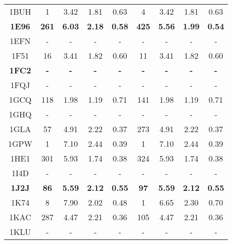 \begin{longtable}{c c c c c|c c c c}
 {\tiny 1BUH} &{\tiny 1}&{\tiny 3.42}&{\tiny 1.81}&{\tiny 0.63} &{\tiny 4}&{\tiny 3.42}&{\tiny 1.81}&{\tiny 0.63}\\ 
 \textbf{\tiny 1E96} &\textbf{\tiny 261}&\textbf{\tiny 6.03}&\textbf{\tiny 2.18}&\textbf{\tiny 0.58} &\textbf{\tiny 425}&\textbf{\tiny 5.56}&\textbf{\tiny 1.99}&\textbf{\tiny 0.54}\\ 
 {\tiny 1EFN} &{\tiny -}&{\tiny -}&{\tiny -}&{\tiny -} &{\tiny -}&{\tiny -}&{\tiny -}&{\tiny -}\\ 
 {\tiny 1F51} &{\tiny 16}&{\tiny 3.41}&{\tiny 1.82}&{\tiny 0.60} &{\tiny 11}&{\tiny 3.41}&{\tiny 1.82}&{\tiny 0.60}\\ 
 \textbf{\tiny 1FC2} &\textbf{\tiny -}&\textbf{\tiny -}&\textbf{\tiny -}&\textbf{\tiny -} &\textbf{\tiny -}&\textbf{\tiny -}&\textbf{\tiny -}&\textbf{\tiny -}\\ 
 {\tiny 1FQJ} &{\tiny -}&{\tiny -}&{\tiny -}&{\tiny -} &{\tiny -}&{\tiny -}&{\tiny -}&{\tiny -}\\ 
 {\tiny 1GCQ} &{\tiny 118}&{\tiny 1.98}&{\tiny 1.19}&{\tiny 0.71} &{\tiny 141}&{\tiny 1.98}&{\tiny 1.19}&{\tiny 0.71}\\ 
 {\tiny 1GHQ} &{\tiny -}&{\tiny -}&{\tiny -}&{\tiny -} &{\tiny -}&{\tiny -}&{\tiny -}&{\tiny -}\\ 
 {\tiny 1GLA} &{\tiny 57}&{\tiny 4.91}&{\tiny 2.22}&{\tiny 0.37} &{\tiny 273}&{\tiny 4.91}&{\tiny 2.22}&{\tiny 0.37}\\ 
 {\tiny 1GPW} &{\tiny 1}&{\tiny 7.10}&{\tiny 2.44}&{\tiny 0.39} &{\tiny 1}&{\tiny 7.10}&{\tiny 2.44}&{\tiny 0.39}\\ 
 {\tiny 1HE1} &{\tiny 301}&{\tiny 5.93}&{\tiny 1.74}&{\tiny 0.38} &{\tiny 324}&{\tiny 5.93}&{\tiny 1.74}&{\tiny 0.38}\\ 
 {\tiny 1I4D} &{\tiny -}&{\tiny -}&{\tiny -}&{\tiny -} &{\tiny -}&{\tiny -}&{\tiny -}&{\tiny -}\\ 
 \textbf{\tiny 1J2J} &\textbf{\tiny 86}&\textbf{\tiny 5.59}&\textbf{\tiny 2.12}&\textbf{\tiny 0.55} &\textbf{\tiny 97}&\textbf{\tiny 5.59}&\textbf{\tiny 2.12}&\textbf{\tiny 0.55}\\ 
 {\tiny 1K74} &{\tiny 8}&{\tiny 7.90}&{\tiny 2.02}&{\tiny 0.48} &{\tiny 1}&{\tiny 6.65}&{\tiny 2.30}&{\tiny 0.70}\\ 
 {\tiny 1KAC} &{\tiny 287}&{\tiny 4.47}&{\tiny 2.21}&{\tiny 0.36} &{\tiny 105}&{\tiny 4.47}&{\tiny 2.21}&{\tiny 0.36}\\ 
 {\tiny 1KLU} &{\tiny -}&{\tiny -}&{\tiny -}&{\tiny -} &{\tiny -}&{\tiny -}&{\tiny -}&{\tiny -}\\ 

\end{longtable}
